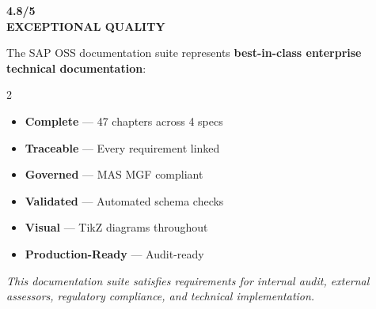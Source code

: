 \documentclass[11pt,a4paper]{report}
\begin{document}
\begin{mdframed}[style=highlightbox]
\begin{center}
{\Huge\bfseries\textcolor{goldaccent}{4.8/5}}\\[0.3cm]
{\Large\bfseries\textcolor{sapamberdark}{EXCEPTIONAL QUALITY}}\\[0.5cm]
\end{center}

The SAP OSS documentation suite represents \textbf{best-in-class enterprise
technical documentation}:

\begin{multicols}{2}
\begin{itemize}[nosep]
  \item[\textcolor{successgreen}{\ding{51}}] \textbf{Complete} --- 47 chapters across 4 specs
  \item[\textcolor{successgreen}{\ding{51}}] \textbf{Traceable} --- Every requirement linked
  \item[\textcolor{successgreen}{\ding{51}}] \textbf{Governed} --- MAS MGF compliant
  \item[\textcolor{successgreen}{\ding{51}}] \textbf{Validated} --- Automated schema checks
  \item[\textcolor{successgreen}{\ding{51}}] \textbf{Visual} --- TikZ diagrams throughout
  \item[\textcolor{successgreen}{\ding{51}}] \textbf{Production-Ready} --- Audit-ready
\end{itemize}
\end{multicols}
\end{mdframed}

\vspace{0.5cm}

\begin{center}
\textit{This documentation suite satisfies requirements for internal audit,
external assessors, regulatory compliance, and technical implementation.}
\end{center}
\end{document}
